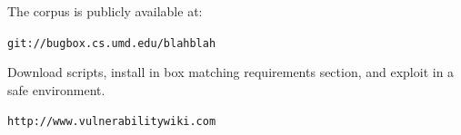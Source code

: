 \documentclass[letterpaper,twocolumn,10pt]{article}
\begin{document}
The corpus is publicly available at:

\begin{center}
{\tt git://bugbox.cs.umd.edu/blahblah}
\end{center}

Download scripts, install in box matching requirements section, and exploit in a safe environment.

\begin{center}
{\tt http://www.vulnerabilitywiki.com}
\end{center}

{\footnotesize 
}
\end{document}
